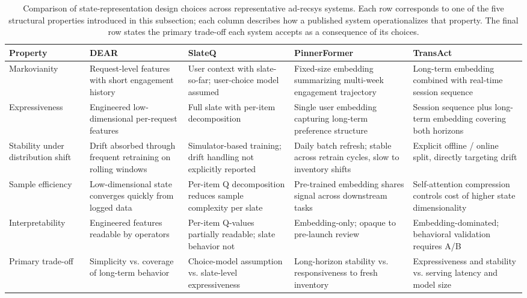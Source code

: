 \documentclass[manuscript,review,screen]{acmart}
\begin{document}
\begin{table}[ht]
\centering
\footnotesize
\renewcommand{\arraystretch}{1.15}
\setlength{\tabcolsep}{4pt}
\begin{tabularx}{\textwidth}{>{\raggedright\arraybackslash}p{} >{\raggedright\arraybackslash}X >{\raggedright\arraybackslash}X >{\raggedright\arraybackslash}X >{\raggedright\arraybackslash}X}
\toprule
\textbf{Property} & \textbf{DEAR \cite{zhao2021dear}} & \textbf{SlateQ \cite{ie2019slateq}} & \textbf{PinnerFormer \cite{pancha2022pinnerformer}} & \textbf{TransAct \cite{xia2023transact}} \\
\midrule
Markovianity & Request-level features with short engagement history & User context with slate-so-far; user-choice model assumed & Fixed-size embedding summarizing multi-week engagement trajectory & Long-term embedding combined with real-time session sequence \\
Expressiveness & Engineered low-dimensional per-request features & Full slate with per-item decomposition & Single user embedding capturing long-term preference structure & Session sequence plus long-term embedding covering both horizons \\
Stability under distribution shift & Drift absorbed through frequent retraining on rolling windows & Simulator-based training; drift handling not explicitly reported & Daily batch refresh; stable across retrain cycles, slow to inventory shifts & Explicit offline / online split, directly targeting drift \\
Sample efficiency & Low-dimensional state converges quickly from logged data & Per-item Q decomposition reduces sample complexity per slate & Pre-trained embedding shares signal across downstream tasks & Self-attention compression controls cost of higher state dimensionality \\
Interpretability & Engineered features readable by operators & Per-item Q-values partially readable; slate behavior not & Embedding-only; opaque to pre-launch review & Embedding-dominated; behavioral validation requires A/B \\
Primary trade-off & Simplicity vs. coverage of long-term behavior & Choice-model assumption vs. slate-level expressiveness & Long-horizon stability vs. responsiveness to fresh inventory & Expressiveness and stability vs. serving latency and model size \\
\bottomrule
\end{tabularx}
\caption{Comparison of state-representation design choices across representative ad-recsys systems. Each row corresponds to one of the five structural properties introduced in this subsection; each column describes how a published system operationalizes that property. The final row states the primary trade-off each system accepts as a consequence of its choices.}
\label{tab:state-space-comparison}
\end{table}
\end{document}
